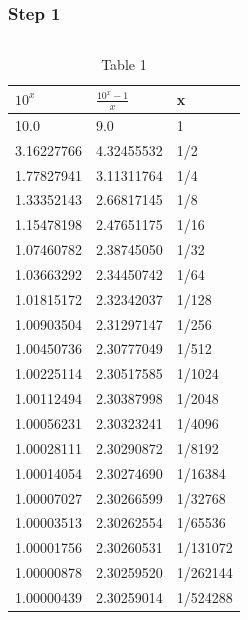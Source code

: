 \documentclass{beamer}
\begin{document}
\begin{frame}
    \frametitle{Step 1}
    \begin{columns}
    \begin{table}[]
        \caption{Table 1}
        \tiny
        \centering
        \def\arraystretch{1.2}
        \begin{tabular}{|l|l|l|} \hline
        $10^x$ & $\frac{10^x-1}{x}$ & x        \\ \hline  \hline
        10.0                  & 9.0                         & 1        \\ \hline
        3.16227766    & 4.32455532          & 1/2      \\ \hline
        1.77827941    & 3.11311764          & 1/4      \\ \hline
        1.33352143    & 2.66817145          & 1/8      \\ \hline
        1.15478198    & 2.47651175          & 1/16     \\ \hline
        1.07460782    & 2.38745050          & 1/32     \\ \hline
        1.03663292    & 2.34450742          & 1/64     \\ \hline
        1.01815172    & 2.32342037          & 1/128    \\ \hline
        1.00903504    & 2.31297147          & 1/256    \\ \hline
        1.00450736    & 2.30777049          & 1/512    \\ \hline
        1.00225114    & 2.30517585          & 1/1024   \\ \hline
        1.00112494    & 2.30387998          & 1/2048   \\ \hline
        1.00056231    & 2.30323241          & 1/4096   \\ \hline
        1.00028111    & 2.30290872          & 1/8192   \\ \hline
        1.00014054    & 2.30274690          & 1/16384  \\ \hline
        1.00007027    & 2.30266599          & 1/32768  \\ \hline
        1.00003513    & 2.30262554          & 1/65536  \\ \hline
        1.00001756    & 2.30260531         & 1/131072 \\ \hline
        1.00000878    & 2.30259520          & 1/262144 \\ \hline
        1.00000439    & 2.30259014          & 1/524288 \\ \hline

\end{tabular}
\end{table}
\end{columns}
\end{frame}
\end{document}
